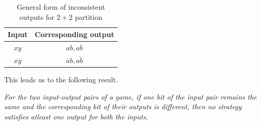 \documentclass[]{svjour3}
\begin{document}
\begin{table}[htbp]
	\begin{center}
		\begin{tabular}{ |c|c| } 
			\hline
			Input & Corresponding output\\
			\hline
			\hline
			$xy$ & $ab, a\overline{b}$\\
			\hline
			$x\overline{y}$ & $\overline{a}b, \overline{ab}$\\
			\hline
		\end{tabular}
	\caption{General form of inconsistent outputs for $2+2$ partition}
	\label{inconsis}
	\end{center}
\end{table}


This leads us to the following result.

\begin{theorem}
		\label{thm1}
	{\it For the two input-output pairs of a game, if one bit of the input pair remains the same and the corresponding bit of their outputs is different, then no strategy satisfies atleast one output for both the inputs.}
	
\end{theorem}
\end{document}
